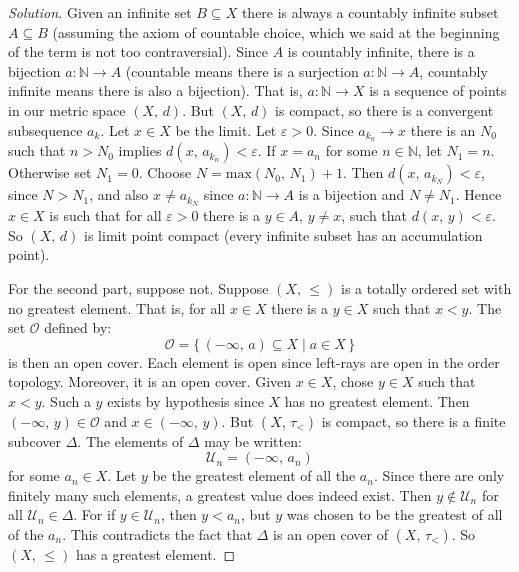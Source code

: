 \documentclass{article}
\theoremstyle{normal}
\begin{document}
    \begin{proof}[Solution]
        Given an infinite set $B\subseteq{X}$ there is always a countably
        infinite subset $A\subseteq{B}$ (assuming the axiom of countable choice,
        which we said at the beginning of the term is not too contraversial).
        Since $A$ is countably infinite, there is a bijection
        $a:\mathbb{N}\rightarrow{A}$ (countable means there is a surjection
        $a:\mathbb{N}\rightarrow{A}$, countably infinite means there is also a
        bijection). That is, $a:\mathbb{N}\rightarrow{X}$ is a sequence of
        points in our metric space $(X,\,d)$. But $(X,\,d)$ is compact, so
        there is a convergent subsequence $a_{k}$. Let $x\in{X}$ be the
        limit. Let $\varepsilon>0$. Since $a_{k_{n}}\rightarrow{x}$ there is
        an $N_{0}$ such that $n>N_{0}$ implies $d(x,\,a_{k_{n}})<\varepsilon$.
        If $x=a_{n}$ for some $n\in\mathbb{N}$, let $N_{1}=n$. Otherwise set
        $N_{1}=0$. Choose $N=\textrm{max}(N_{0},\,N_{1})+1$. Then
        $d(x,\,a_{k_{N}})<\varepsilon$, since $N>N_{1}$, and also
        $x\ne{a}_{k_{N}}$ since $a:\mathbb{N}\rightarrow{A}$ is a bijection and
        $N\ne{N}_{1}$. Hence $x\in{X}$ is such that for all $\varepsilon>0$
        there is a $y\in{A}$, $y\ne{x}$, such that $d(x,\,y)<\varepsilon$. So
        $(X,\,d)$ is limit point compact (every infinite subset has an
        accumulation point).
        \par\hfill\par
        For the second part, suppose not. Suppose $(X,\,\leq)$ is a totally
        ordered set with no greatest element. That is, for all
        $x\in{X}$ there is a $y\in{X}$ such that $x<y$. The set
        $\mathcal{O}$ defined by:
        \begin{equation}
            \mathcal{O}=\{\,(-\infty,\,a)\subseteq{X}\;|\;a\in{X}\,\}
        \end{equation}
        is then an open cover. Each element is open since left-rays are open
        in the order topology. Moreover, it is an open cover. Given
        $x\in{X}$, chose $y\in{X}$ such that $x<y$. Such a $y$ exists by
        hypothesis since $X$ has no greatest element. Then
        $(-\infty,\,y)\in\mathcal{O}$ and $x\in(-\infty,\,y)$. But
        $(X,\,\tau_{<})$ is compact, so there is a finite subcover
        $\Delta$. The elements of $\Delta$ may be written:
        \begin{equation}
            \mathcal{U}_{n}=(-\infty,\,a_{n})
        \end{equation}
        for some $a_{n}\in{X}$. Let $y$ be the greatest element of all the
        $a_{n}$. Since there are only finitely many such elements, a greatest
        value does indeed exist. Then $y\notin\mathcal{U}_{n}$ for all
        $\mathcal{U}_{n}\in\Delta$. For if $y\in\mathcal{U}_{n}$, then
        $y<a_{n}$, but $y$ was chosen to be the greatest of all of the $a_{n}$.
        This contradicts the fact that $\Delta$ is an open cover of
        $(X,\,\tau_{<})$. So $(X,\,\leq)$ has a greatest element.
    \end{proof}
\end{document}
